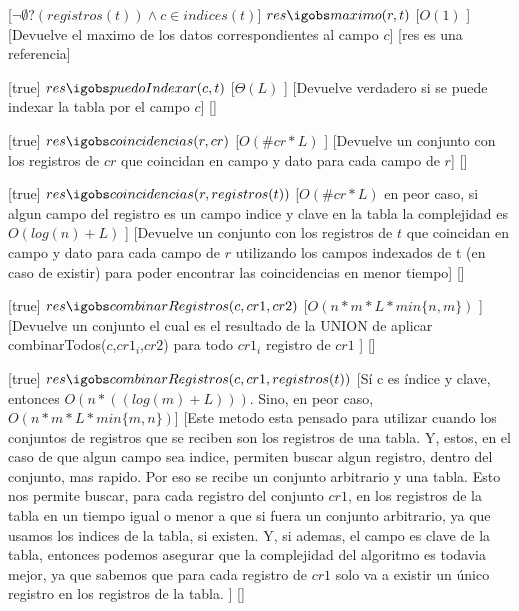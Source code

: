 \begin{Interfaz}
   [$\neg \emptyset ?(registros(t)) \land c \in indices(t)$] %
   {$res \igobs maximo(r,t)$} %
   [$O(1)$ ] %
   [Devuelve el maximo  de los datos correspondientes al campo $c$] %
   [res es una referencia] %
  
   [true] %
   {$res \igobs puedoIndexar(c,t)$} %
   [$\Theta(L)$ ] %
   [Devuelve verdadero si se puede indexar la tabla por el campo $c$] %
   [] %
  
   [true] %
   {$res \igobs coincidencias(r,cr)$} %
   [$O(\#cr * L)$ ] %
   [Devuelve un conjunto con los registros de $cr$ que coincidan en campo y dato para cada campo de $r$] %
   [] %
  
   [true] %
   {$res \igobs coincidencias(r,registros(t))$} %
   [$O(\#cr * L)$ en peor caso, si algun campo del registro es un campo indice y clave en la tabla la complejidad es $O(log(n) + L)$ ] %
   [Devuelve un conjunto con los registros de $t$ que coincidan en campo y dato para cada campo de $r$ utilizando los campos indexados de t (en caso de existir) para poder encontrar las coincidencias en menor tiempo] %
   [] %
  
   [true] %
   {$res \igobs combinarRegistros(c,cr1,cr2)$} %
   [$O(n * m * L * min\{n,m\})$ ] %
   [Devuelve un conjunto el cual es el resultado de la UNION de aplicar combinarTodos($c$,$cr1_i$,$cr2$) para todo $cr1_i$ registro de $cr1$ ] %
   [] %
   
   [true] %
   {$res \igobs combinarRegistros(c,cr1,registros(t))$} %
   [S\'i c es \'indice y clave, entonces $O(n*((log(m) + L)))$. Sino, en peor caso, $O(n*m*L*min\lbrace m, n \rbrace)$] %
   [Este metodo esta pensado para utilizar cuando los conjuntos de registros que se reciben son los registros de una tabla. Y, estos, en el caso de que algun campo sea indice, permiten buscar algun registro, dentro del conjunto, mas rapido. Por eso se recibe un conjunto arbitrario y una tabla. Esto nos permite buscar, para cada registro del conjunto $cr1$, en los registros de la tabla en un tiempo igual o menor a que si fuera un conjunto arbitrario, ya que usamos los indices de la tabla, si existen. Y, si ademas, el campo es clave de la tabla, entonces podemos asegurar que la complejidad del algoritmo es todavia mejor, ya que sabemos que para cada registro de $cr1$ solo va a existir un \'unico registro en los registros de la tabla. ]%
   [] %
  

\end{Interfaz}
